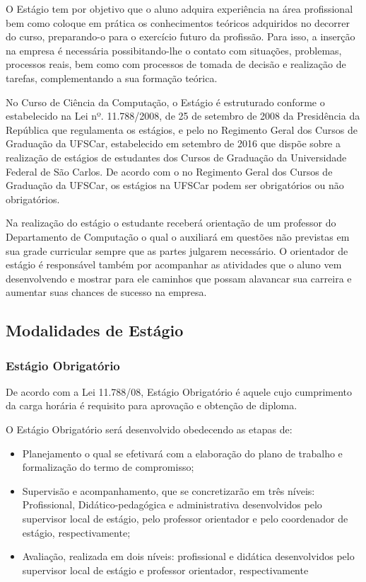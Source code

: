 

O Estágio tem por objetivo que o aluno adquira experiência na área profissional bem como coloque em prática os conhecimentos teóricos adquiridos no decorrer do curso, preparando-o para o exercício futuro da profissão. Para isso, a inserção na empresa é necessária possibitando-lhe o contato com situações, problemas, processos reais, bem como com processos de tomada de decisão e realização de tarefas, complementando a sua formação teórica.

No Curso de Ciência da Computação, o Estágio é estruturado conforme o estabelecido na Lei nº. 11.788/2008, de 25 de setembro de 2008 da Presidência da República que regulamenta os estágios, e pelo no Regimento Geral dos Cursos de Graduação da UFSCar, estabelecido em setembro de 2016 que dispõe sobre a realização de estágios de estudantes dos Cursos de Graduação da Universidade Federal de São Carlos. De acordo com o no Regimento Geral dos Cursos de Graduação da UFSCar, os estágios na UFSCar podem ser obrigatórios ou não obrigatórios. 

Na realização do estágio o estudante receberá orientação de um professor do Departamento de Computação o qual o auxiliará em questões não previstas em sua grade curricular sempre que as partes julgarem necessário. O orientador de estágio é responsável também por acompanhar as atividades que o aluno vem desenvolvendo e mostrar para ele caminhos que possam alavancar sua carreira e aumentar suas chances de sucesso na empresa. 

\subsection{Modalidades de Estágio}


\subsubsection{Estágio Obrigatório}
De acordo com a Lei 11.788/08, Estágio Obrigatório é aquele cujo cumprimento da carga horária é requisito para aprovação e obtenção de diploma. 

O Estágio Obrigatório será desenvolvido obedecendo as etapas de: 

\begin{itemize}
\item Planejamento o qual se efetivará com a elaboração do plano de trabalho e formalização do termo de compromisso;
\item Supervisão e acompanhamento, que se concretizarão em três níveis: Profissional, Didático-pedagógica e administrativa desenvolvidos pelo supervisor local de estágio, pelo professor orientador e pelo coordenador de estágio, respectivamente;
\item Avaliação, realizada em dois níveis: profissional e didática desenvolvidos pelo supervisor local de estágio e professor orientador, respectivamente 
\end{itemize}

